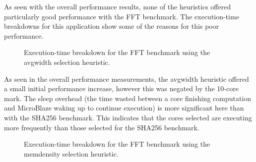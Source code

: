 \documentclass{UoYCSproject}
\begin{document}
As seen with the overall performance results, none of the heuristics offered particularly good performance
with the FFT benchmark. The execution-time breakdowns for this application show some of the reasons for this poor performance.

\begin{figure}[H]
\caption{Execution-time breakdown for the FFT benchmark using the avgwidth selection heuristic.}
\label{fig:breakdownAvgWidthFFT}
\end{figure}

As seen in the overall performance measurements, the avgwidth heuristic offered a small initial performance increase,
however this was negated by the 10-core mark. The sleep overhead (the time wasted between a core finishing computation
and MicroBlaze waking up to continue execution) is more significant here than with the SHA256 benchmark. This indicates that
the cores selected are executing more frequently than those selected for the SHA256 benchmark.

\begin{figure}[H]
\caption{Execution-time breakdown for the FFT benchmark using the memdensity selection heuristic.}
\label{fig:breakdownMemDensityFFT}
\end{figure}
\end{document}
